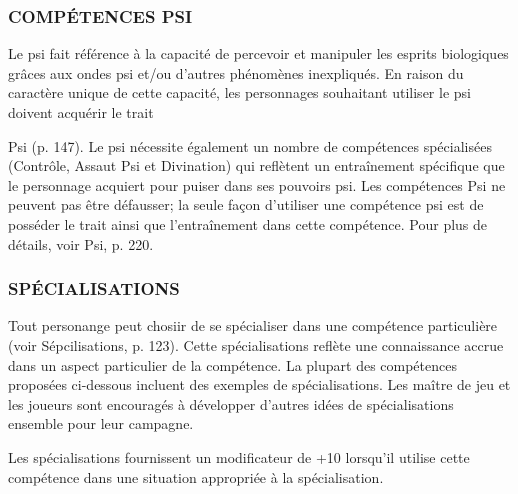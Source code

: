 \subsubsection{COMPÉTENCES PSI} Le psi fait référence à la capacité de percevoir et manipuler les esprits biologiques grâces aux ondes psi et/ou d'autres phénomènes inexpliqués. En raison du caractère unique de cette capacité, les personnages souhaitant utiliser le psi doivent acquérir le trait 



Psi (p. 147). Le psi nécessite également un nombre de compétences spécialisées (Contrôle, Assaut Psi et Divination) qui reflètent un entraînement spécifique que le personnage acquiert pour puiser dans ses pouvoirs psi. Les compétences Psi ne peuvent pas être défausser; la seule façon d'utiliser une compétence psi est de posséder le trait ainsi que l'entraînement dans cette compétence. Pour plus de détails, voir Psi, p. 220. 



\subsubsection{SPÉCIALISATIONS} Tout personange peut chosiir de se spécialiser dans une compétence particulière (voir Sépcilisations, p. 123). Cette spécialisations reflète une connaissance accrue dans un aspect particulier de la compétence. La plupart des compétences proposées ci-dessous incluent des exemples de spécialisations. Les maître de jeu et les joueurs sont encouragés à développer d'autres idées de spécialisations ensemble pour leur campagne. 

Les spécialisations fournissent un modificateur de +10 lorsqu'il utilise cette compétence dans une situation appropriée à la spécialisation. 








